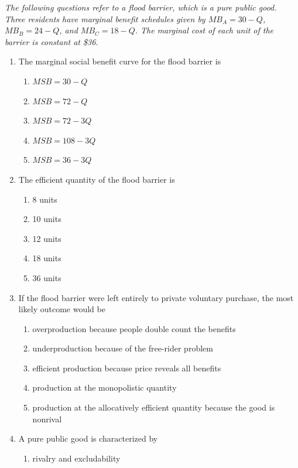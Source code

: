 \documentclass[10pt]{article}
\newenvironment{choiceslist}
  {\begin{enumerate}[label=(\Alph*), leftmargin=1.6em, itemsep=0.12em, topsep=0.18em, parsep=0pt]}
  {\end{enumerate}}
\newenvironment{stimulus}
  {\begin{center}\begin{minipage}{0.96\columnwidth}\footnotesize\itshape\setlength{\tabcolsep}{3pt}\renewcommand{\arraystretch}{0.96}}
  {\end{minipage}\end{center}}
\begin{document}
\begin{multicols*}{2}
\begin{enumerate}[resume*=apq, leftmargin=*, itemsep=0.85em, topsep=0.2em, parsep=0pt]
\begin{choiceslist}
\end{choiceslist}
\end{enumerate}
\begin{stimulus}
The following questions refer to a flood barrier, which is a pure public good. Three residents have marginal benefit schedules given by
$MB_A = 30 - Q$, $MB_B = 24 - Q$, and $MB_C = 18 - Q$.
The marginal cost of each unit of the barrier is constant at \$36.
\end{stimulus}
\begin{enumerate}[resume*=apq, leftmargin=*, itemsep=0.85em, topsep=0.2em, parsep=0pt]
\item The marginal social benefit curve for the flood barrier is
\begin{choiceslist}
\item $MSB = 30 - Q$
\item $MSB = 72 - Q$
\item $MSB = 72 - 3Q$
\item $MSB = 108 - 3Q$
\item $MSB = 36 - 3Q$
\end{choiceslist}
\item The efficient quantity of the flood barrier is
\begin{choiceslist}
\item 8 units
\item 10 units
\item 12 units
\item 18 units
\item 36 units
\end{choiceslist}
\item If the flood barrier were left entirely to private voluntary purchase, the most likely outcome would be
\begin{choiceslist}
\item overproduction because people double count the benefits
\item underproduction because of the free-rider problem
\item efficient production because price reveals all benefits
\item production at the monopolistic quantity
\item production at the allocatively efficient quantity because the good is nonrival
\end{choiceslist}
\item A pure public good is characterized by
\begin{choiceslist}
\item rivalry and excludability

\end{choiceslist}
\end{enumerate}
\end{multicols*}
\end{document}
